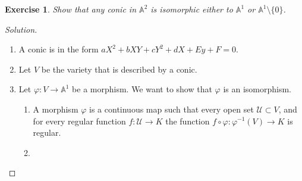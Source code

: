 \documentclass[11pt]{book}
\newtheorem{exercise}{Exercise}[section]
\newenvironment{solution}
  {\renewcommand{\qedsymbol}{}\begin{proof}[Solution]}
  {\end{proof}}
\theoremstyle{definition}
\numberwithin{equation}{section}
\begin{document}
\begin{exercise}
    Show that any conic in \(\mathbb{A}^2\) is isomorphic either to \(\mathbb{A}^1\) or \(\mathbb{A}^1 \setminus \{0\}\).
\end{exercise}
\begin{solution}
    \begin{enumerate}
        \item A conic is in the form \(aX^2 + bXY + cY^2 + dX + Ey + F = 0\).
        \item Let \(V\) be the variety that is described by a conic.
        \item Let \(\varphi: V \rightarrow \mathbb{A}^1\) be a morphism. We want to show that \(\varphi\) is an isomorphism.
        \begin{enumerate} 
            \item A morphism \(\varphi\) is a continuous map such that every open set \(\mathcal{U} \subset V\), and for every regular function \(f: \mathcal{U} \rightarrow K\) the function \(f \circ \varphi: \varphi^{-1}(V) \rightarrow K\) is regular.
            \item 
        \end{enumerate}
    \end{enumerate}
\end{solution}
\printbibliography
\end{document}
